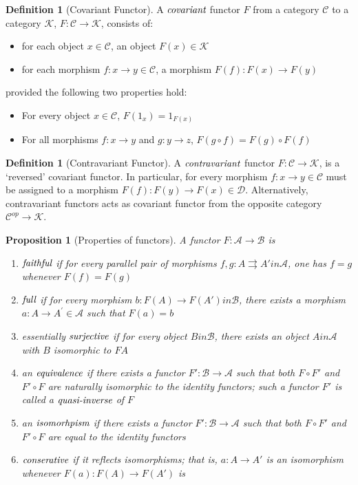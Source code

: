 \documentclass[10pt, oneside, reqno]{amsart}
\theoremstyle{plain}%
\newtheorem{prop}[thm]{Proposition}
\theoremstyle{definition}
\newtheorem{defn}[thm]{Definition}
\theoremstyle{remark}
\begin{document}
\begin{defn}[Covariant Functor]
 A $\emph{covariant}$ functor $F$ from a category $\mathcal{C}$ to a category $\mathcal{K}$, $F: \mathcal{C} \to \mathcal{K}$, consists of:
 \begin{itemize}
  \item for each object $x \in \mathcal{C}$, an object $F(x) \in \mathcal{K}$
  \item for each morphism $f: x \to y \in \mathcal{C}$, a morphism $F(f): F(x) \to F(y)$
 \end{itemize}
 provided the following two properties hold:
 \begin{itemize}
  \item For every object $x \in \mathcal{C}$, $F(1_{x}) = 1_{F(x)}$
  \item For all morphisms $f: x \to y$ and $g: y \to z$, $F(g \circ f) = F(g) \circ F(f)$
 \end{itemize}
\end{defn}

\begin{defn}[Contravariant Functor]
 A $\emph{contravariant}$ functor $F: \mathcal{C} \to \mathcal{K}$, is a `reversed' covariant functor.
 In particular, for every morphism $f: x \to y \in \mathcal{C}$ must be assigned to a morphism $F(f) : F(y) \to F(x) \in \mathcal{D}$.
 Alternatively, contravariant functors acts as covariant functor from the opposite category $\mathcal{C}^{op} \to \mathcal{K}$.
\end{defn}

\begin{prop}[Properties of functors]
A functor $F : \mathcal{A} \to \mathcal{B}$ is
\begin{enumerate}
	\item $\emph{faithful}$ if for every parallel pair of morphisms $f,g : A \rightrightarrows A' in \mathcal{A}$, one has $f = g$ whenever $F(f) = F(g)$
	\item $\emph{full}$ if for every morphism $b: F(A) \to F(A') in \mathcal{B}$, there exists a morphism $a: A \to A^{'} \in \mathcal{A}$ such that $F(a) = b$
	\item essentially $\emph{surjective}$ if for every object $B in \mathcal{B}$, there exists an object $A in \mathcal{A}$ with $B$ isomorphic to $F A$
	\item an $\emph{equivalence}$ if there exists a functor $F' : \mathcal{B} \to \mathcal{A}$ such that both $F \circ F'$ and $F' \circ F$ are naturally
		isomorphic to the identity functors; such a functor $F'$ is called a $\emph{quasi-inverse}$ of $F$
	\item an $\emph{isomorhpism}$ if there exists a functor $F' : \mathcal{B} \to \mathcal{A}$ such that both $F \circ F'$ and $F' \circ F$ are equal to the identity functors
	\item $\emph{conserative}$ if it reflects isomorphisms; that is, $a: A \to A'$ is an isomorphism whenever $F(a): F(A) \to F(A')$ is
\end{enumerate}
\end{prop}
\end{document}
